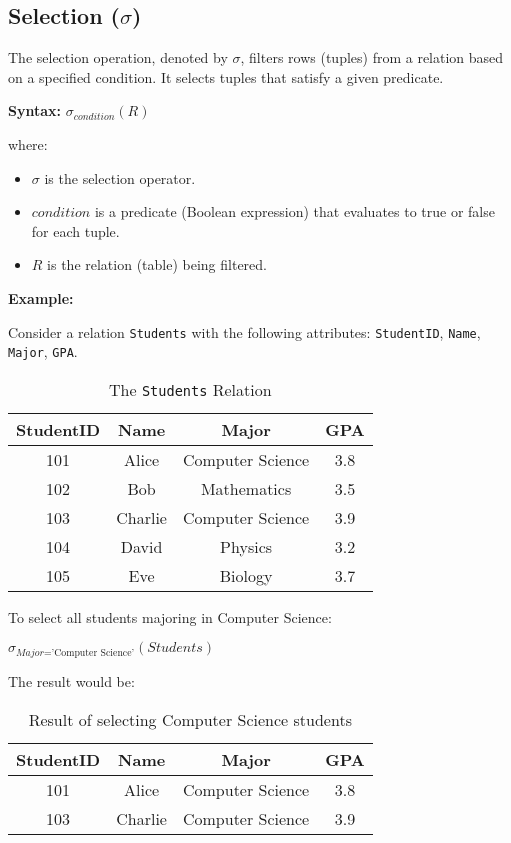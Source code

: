\documentclass[12pt]{book}
\begin{document}
\subsection{Selection ($\sigma$)}

The selection operation, denoted by $\sigma$, filters rows (tuples) from a relation based on a specified condition. It selects tuples that satisfy a given predicate.

\textbf{Syntax:} $\sigma_{\textit{condition}}(\mathit{R})$

where:
\begin{itemize}
    \item $\sigma$ is the selection operator.
    \item $\textit{condition}$ is a predicate (Boolean expression) that evaluates to true or false for each tuple.
    \item $\mathit{R}$ is the relation (table) being filtered.
\end{itemize}

\textbf{Example:}

Consider a relation \texttt{Students} with the following attributes: \texttt{StudentID}, \texttt{Name}, \texttt{Major}, \texttt{GPA}.

\begin{table}[htbp] %
\centering
\begin{tabular}{@{}cccc@{}} %
\toprule
StudentID & Name & Major & GPA \\
\midrule
101 & Alice & Computer Science & 3.8 \\
102 & Bob & Mathematics & 3.5 \\
103 & Charlie & Computer Science & 3.9 \\
104 & David & Physics & 3.2 \\
105 & Eve & Biology & 3.7 \\
\bottomrule
\end{tabular}
\caption{The \texttt{Students} Relation}
\label{tab:students}
\end{table}

To select all students majoring in Computer Science:

$\sigma_{\textit{Major} = \text{'Computer Science'}}(\mathit{Students})$

The result would be:

\begin{table}[htbp]
\centering
\begin{tabular}{@{}cccc@{}}
\toprule
StudentID & Name & Major & GPA \\
\midrule
101 & Alice & Computer Science & 3.8 \\
103 & Charlie & Computer Science & 3.9 \\
\bottomrule
\end{tabular}
\caption{Result of selecting Computer Science students}
\label{tab:select_cs_students}
\end{table}
\end{document}
